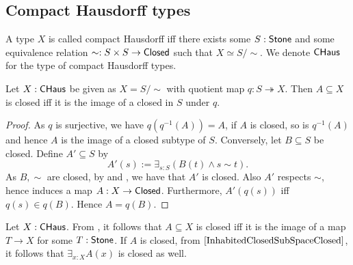\subsection{Compact Hausdorff types}


\begin{definition}
  A type $X$ is called compact Hausdorff iff there exists some $S:\mathsf{Stone}$ and some 
  equivalence relation $\sim:S \times S \to \mathsf{Closed}$ such that $X \simeq S / \sim$. 
  We denote $\mathsf{CHaus}$ for the type of compact Hausdorff types. 
\end{definition} 

\begin{lemma}\label{CompactHausdorffClosed}
  Let $X:\mathsf{CHaus}$ be given as $X=S/\sim$ with quotient map $q:S\twoheadrightarrow X$.
  Then $A\subseteq X$ is closed iff it is the image of a closed in $S$ under $q$. 
\end{lemma}
\begin{proof}
  As $q$ is surjective, we have $q(q^{-1}(A)) = A$,
  if $A$ is closed, so is $q^{-1}(A)$ and 
  hence $A$ is the image of a closed subtype of $S$. 
  Conversely, let $B\subseteq S$ be closed. 
  Define $A'\subseteq S$ by 
  $$A'(s) := \exists_{s:S} (B(t) \wedge s \sim t).$$
  As $B, \sim$ are closed, by  and , 
  we have that $A'$  is closed. 
  Also $A'$ respects $\sim$, hence induces a map $A: X\to \mathsf{Closed}$.
  Furthermore, $A'(q(s))$ iff $q(s)\in q(B)$. 
  Hence $A=q(B)$. 
\end{proof}
\begin{remark}\label{InhabitedClosedSubSpaceClosedCHaus}
  Let $X:\mathsf{CHaus}$.
  From , it follows that $A\subseteq X$ is closed iff it is the image of a map 
  $T\to X$ for some $T:\mathsf{Stone}$. 
  If $A$ is closed, from $\Cref{InhabitedClosedSubSpaceClosed}$, it follows that $\exists_{x:X} A(x)$ is closed as well. 
\end{remark}
